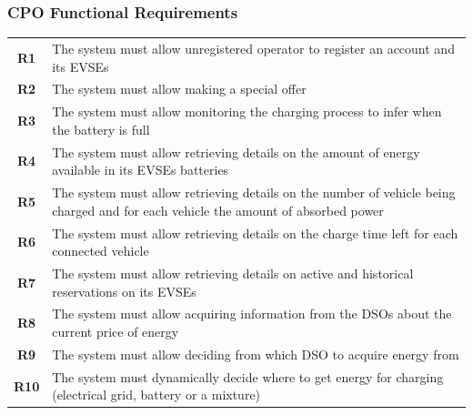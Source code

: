 \subsubsection{CPO Functional Requirements}
\begin{table}[H]
    \begin{tabularx}{\textwidth}{cX}
        \toprule
        \textbf{R1}  & The system must allow unregistered operator to register an account and its EVSEs                                                  \\
        \textbf{R2}  & The system must allow making a special offer                                                                                      \\
        \textbf{R3}  & The system must allow monitoring the charging process to infer when the battery is full                                           \\
        \textbf{R4}  & The system must allow retrieving details on the amount of energy available in its EVSEs batteries                                 \\
        \textbf{R5}  & The system must allow retrieving details on the number of vehicle being charged and for each vehicle the amount of absorbed power \\
        \textbf{R6}  & The system must allow retrieving details on the charge time left for each connected vehicle                                       \\
        \textbf{R7}  & The system must allow retrieving details on active and historical reservations on its EVSEs                                       \\
        \textbf{R8}  & The system must allow acquiring information from the DSOs about the current price of energy                                       \\
        \textbf{R9}  & The system must allow deciding from which DSO to acquire energy from                                                              \\
        \textbf{R10} & The system must dynamically decide where to get energy for charging (electrical grid, battery or a mixture)                       \\ \bottomrule
    \end{tabularx}
\end{table}
